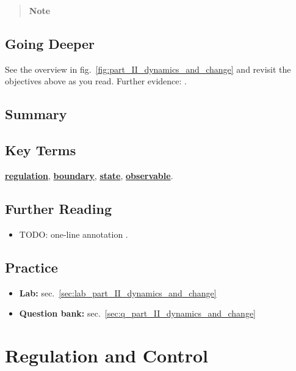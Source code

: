 \documentclass[
]{article}
\providecommand{\tightlist}{%
  \setlength{\itemsep}{0pt}\setlength{\parskip}{0pt}}
\theoremstyle{plain}
\theoremstyle{definition}
\begin{document}
\begin{quote}
\textbf{Note}
\end{quote}

\subsection{Going Deeper}\label{going-deeper-6}

See the overview in fig.~\ref{fig:part_II_dynamics_and_change} and
revisit the objectives above as you read. Further evidence:
\citep{brown2017principles, wilson2021analysis}.

\subsection{Summary}\label{summary-7}

\subsection{Key Terms}\label{key-terms-7}

\hyperref[gl:regulation]{\textbf{regulation}},
\hyperref[gl:boundary]{\textbf{boundary}},
\hyperref[gl:state]{\textbf{state}},
\hyperref[gl:observable]{\textbf{observable}}.

\subsection{Further Reading}\label{further-reading-7}

\begin{itemize}
\item
  TODO: one-line annotation \citep{taylor2019theory}.
\end{itemize}

\subsection{Practice}\label{practice-7}

\begin{itemize}
\tightlist
\item
  \textbf{Lab:} sec.~\ref{sec:lab_part_II_dynamics_and_change}
\item
  \textbf{Question bank:} sec.~\ref{sec:q_part_II_dynamics_and_change}
\end{itemize}

\newpage

\section{Regulation and
Control}\label{sec:part_II_regulation_and_control}
\end{document}
